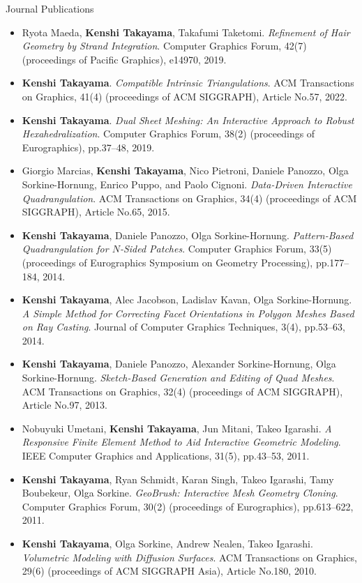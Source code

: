 {\Large\sc Journal Publications}
\vspace{-3mm}
\begin{itemize}
\item Ryota Maeda, {\bf Kenshi Takayama}, Takafumi Taketomi. {\it Refinement of Hair Geometry by Strand Integration}. Computer Graphics Forum, 42(7) (proceedings of Pacific Graphics), e14970, 2019.
\item {\bf Kenshi Takayama}. {\it Compatible Intrinsic Triangulations}. ACM Transactions on Graphics, 41(4) (proceedings of ACM SIGGRAPH), Article No.57, 2022.
\item {\bf Kenshi Takayama}. {\it Dual Sheet Meshing: An Interactive Approach to Robust Hexahedralization}. Computer Graphics Forum, 38(2) (proceedings of Eurographics), pp.37--48, 2019.
\item Giorgio Marcias, {\bf Kenshi Takayama}, Nico Pietroni, Daniele Panozzo, Olga Sorkine-Hornung, Enrico Puppo, and Paolo Cignoni. {\it Data-Driven Interactive Quadrangulation}. ACM Transactions on Graphics, 34(4) (proceedings of ACM SIGGRAPH), Article No.65, 2015.
\item {\bf Kenshi Takayama}, Daniele Panozzo, Olga Sorkine-Hornung. {\it Pattern-Based Quadrangulation for $N$-Sided Patches}. Computer Graphics Forum, 33(5) (proceedings of Eurographics Symposium on Geometry Processing), pp.177--184, 2014.
\item {\bf Kenshi Takayama}, Alec Jacobson, Ladislav Kavan, Olga Sorkine-Hornung. {\it A Simple Method for Correcting Facet Orientations in Polygon Meshes Based on Ray Casting}. Journal of Computer Graphics Techniques, 3(4), pp.53--63, 2014.
\item {\bf Kenshi Takayama}, Daniele Panozzo, Alexander Sorkine-Hornung, Olga Sorkine-Hornung. {\it Sketch-Based Generation and Editing of Quad Meshes}. ACM Transactions on Graphics, 32(4) (proceedings of ACM SIGGRAPH), Article No.97, 2013.
\item Nobuyuki Umetani, {\bf Kenshi Takayama}, Jun Mitani, Takeo Igarashi. {\it A Responsive Finite Element Method to Aid Interactive Geometric Modeling}. IEEE Computer Graphics and Applications, 31(5), pp.43--53, 2011.
\item {\bf Kenshi Takayama}, Ryan Schmidt, Karan Singh, Takeo Igarashi, Tamy Boubekeur, Olga Sorkine. {\it GeoBrush: Interactive Mesh Geometry Cloning}. Computer Graphics Forum, 30(2) (proceedings of Eurographics), pp.613--622, 2011.
\item {\bf Kenshi Takayama}, Olga Sorkine, Andrew Nealen, Takeo Igarashi. {\it Volumetric Modeling with Diffusion Surfaces}. ACM Transactions on Graphics, 29(6) (proceedings of ACM SIGGRAPH Asia), Article No.180, 2010.

\end{itemize}
